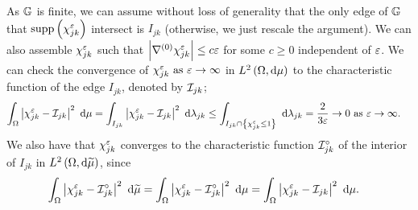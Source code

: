 As $\mathbb{G}$ is finite, we can assume without loss of generality that the only edge of $\mathbb{G}$ that $\mathrm{supp}\left( \chi_{jk}^\varepsilon \right)$ intersect is $I_{jk}$ (otherwise, we just rescale the argument).
We can also assemble $\chi_{jk}^\varepsilon$ such that $\left\lvert  \nabla^{(0)}\chi_{jk}^{\varepsilon}  \right\rvert \leq c\varepsilon$ for some $c\geq 0$ independent of $\varepsilon$.
We can check the convergence of $\chi_{jk}^\varepsilon \ \text{as} \ \varepsilon \rightarrow\infty$ in $L^{2}\left( \Omega,\mathrm{d}\mu \right)$ to the characteristic function of the edge $I_{jk}$, denoted by $\mathcal{I}_{jk}$;
\begin{align*}
	\int_{\Omega} \left\lvert \chi_{jk}^\varepsilon - \mathcal{I}_{jk} \right\rvert^2  \ \mathrm{d}\mu
	&= \int_{I_{jk}} \left\lvert \chi_{jk}^\varepsilon - \mathcal{I}_{jk} \right\rvert^2  \ \mathrm{d}\lambda_{jk}
	\leq \int_{I_{jk}\cap\left\{ \chi_{jk}^\varepsilon\leq 1 \right\}} \ \mathrm{d}\lambda_{jk}
	= \frac{2}{3\varepsilon} \rightarrow 0 \ \text{as} \ \varepsilon \rightarrow\infty.
\end{align*}
We also have that $\chi_{jk}^\varepsilon$ converges to the characteristic function $\mathcal{I}_{jk}^\circ$ of the interior of $I_{jk}$ in $L^{2}\left( \Omega,\mathrm{d}\widetilde{\mu} \right)$, since
\begin{align*}
	\int_{\Omega} \left\lvert \chi_{jk}^\varepsilon - \mathcal{I}_{jk}^\circ \right\rvert^2  \ \mathrm{d}\widetilde{\mu}
	&= \int_{\Omega} \left\lvert \chi_{jk}^\varepsilon - \mathcal{I}_{jk}^\circ \right\rvert^2  \ \mathrm{d}\mu
	= \int_{\Omega} \left\lvert \chi_{jk}^\varepsilon - \mathcal{I}_{jk} \right\rvert^2  \ \mathrm{d}\mu.
\end{align*}


